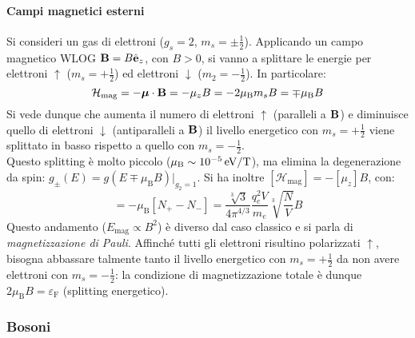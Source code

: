\paragraph{Campi magnetici esterni}

Si consideri un gas di elettroni ($ g_s = 2 $, $ m_s = \pm \frac{1}{2} $). Applicando un campo magnetico WLOG $ \mathbf{B} = B \hat{\mathbf{e}}_z $, con $ B > 0 $, si vanno a splittare le energie per elettroni $ \uparrow $ ($ m_s = + \frac{1}{2} $) ed elettroni $ \downarrow $ ($ m_2 = - \frac{1}{2} $). In particolare:
\begin{equation*}
	\mathcal{H}_\text{mag} = - \boldsymbol{\mu} \cdot \mathbf{B} = - \mu_z B = - 2 \mu_\text{B} m_s B = \mp \mu_\text{B} B
\end{equation*}
Si vede dunque che aumenta il numero di elettroni $ \uparrow $ (paralleli a $ \mathbf{B} $) e diminuisce quello di elettroni $ \downarrow $ (antiparalleli a $ \mathbf{B} $) il livello energetico con $ m_s = + \frac{1}{2} $ viene splittato in basso rispetto a quello con $ m_s = - \frac{1}{2} $. \\
Questo splitting è molto piccolo ($ \mu_\text{B} \sim 10^{-5} \,\mathrm{eV}/\text{T} $), ma elimina la degenerazione da spin: $ g_\pm(E) = g(E \mp \mu_\text{B} B)\vert_{g_2 = 1} $. Si ha inoltre $ [\mathcal{H}_\text{mag}] = - [\mu_z] B $, con:
\begin{equation}
	[\mu_z] = -\mu_\text{B} [N_+ - N_-] = \frac{\sqrt[3]{3}}{4\pi^{4/3}} \frac{q_e^2 V}{m_e} \sqrt[3]{\frac{N}{V}} B
\end{equation}
Questo andamento ($ E_\text{mag} \propto B^2 $) è diverso dal caso classico e si parla di \textit{magnetizzazione di Pauli}. Affinché tutti gli elettroni risultino polarizzati $ \uparrow $, bisogna abbassare talmente tanto il livello energetico con $ m_s = + \frac{1}{2} $ da non avere elettroni con $ m_s = - \frac{1}{2} $: la condizione di magnetizzazione totale è dunque $ 2\mu_\text{B} B = \varepsilon_\text{F} $ (splitting energetico).

\subsubsection{Bosoni}

